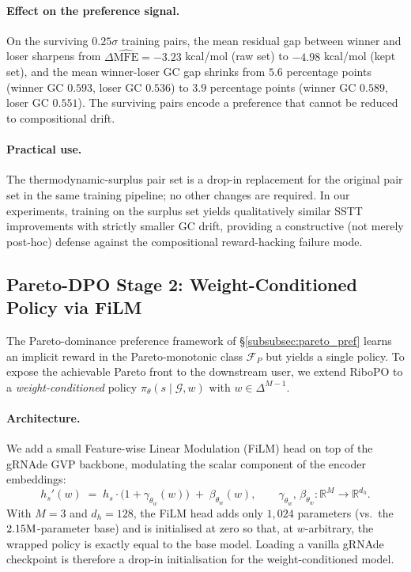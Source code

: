 {{\paragraph{Effect on the preference signal.}
On the surviving $0.25\sigma$ training pairs, the mean residual gap between winner and loser sharpens from $\Delta\widehat{\mathrm{MFE}} = -3.23$ kcal/mol (raw set) to $-4.98$ kcal/mol (kept set), and the mean winner-loser GC gap shrinks from $5.6$ percentage points (winner GC $0.593$, loser GC $0.536$) to $3.9$ percentage points (winner GC $0.589$, loser GC $0.551$). The surviving pairs encode a preference that cannot be reduced to compositional drift.

\paragraph{Practical use.}
The thermodynamic-surplus pair set is a drop-in replacement for the original pair set in the same training pipeline; no other changes are required. In our experiments, training on the surplus set yields qualitatively similar SSTT improvements with strictly smaller GC drift, providing a constructive (not merely post-hoc) defense against the compositional reward-hacking failure mode.


\subsection{Pareto-DPO Stage 2: Weight-Conditioned Policy via FiLM}
\label{app:pareto_dpo_stage2}

The Pareto-dominance preference framework of \S\ref{subsubsec:pareto_pref} learns an implicit reward in the Pareto-monotonic class $\mathcal{F}_P$ but yields a single policy. To expose the achievable Pareto front to the downstream user, we extend RiboPO to a \emph{weight-conditioned} policy $\pi_\theta(s\mid \mathcal{G}, w)$ with $w \in \Delta^{M-1}$.

\paragraph{Architecture.}
We add a small Feature-wise Linear Modulation (FiLM) head on top of the gRNAde GVP backbone, modulating the scalar component of the encoder embeddings:
\begin{equation}
h_s'(w) \;=\; h_s\!\cdot\!\big(1 + \gamma_{\theta_w}(w)\big) \;+\; \beta_{\theta_w}(w),
\qquad \gamma_{\theta_w},\,\beta_{\theta_w} : \mathbb{R}^M \to \mathbb{R}^{d_h}.
\end{equation}
With $M=3$ and $d_h=128$, the FiLM head adds only $1{,}024$ parameters (vs.\ the $2.15{\rm M}$-parameter base) and is initialised at zero so that, at $w$-arbitrary, the wrapped policy is exactly equal to the base model. Loading a vanilla gRNAde checkpoint is therefore a drop-in initialisation for the weight-conditioned model.

}}
